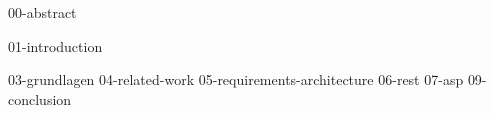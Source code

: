\documentclass[a4paper,oneside,10pt,english,ngerman]{scrbook}
\begin{document}

{00-abstract}






\cleardoubleoddpage
\tableofcontents





\mainmatter


{01-introduction}

{03-grundlagen}
{04-related-work}
{05-requirements-architecture}
{06-rest}
{07-asp}
{09-conclusion}
\end{document}
